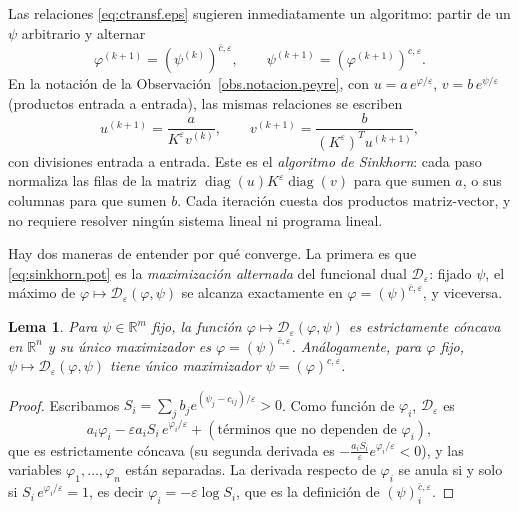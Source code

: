 \documentclass[12pt, a4paper]{amsbook}
\newcommand{\R}{{\mathbb R}}
\newtheorem{lema}[teo]{Lema}
\theoremstyle{remark}
\theoremstyle{definition}
\numberwithin{section}{chapter}
\numberwithin{subsection}{section}
\numberwithin{equation}{section}
\numberwithin{figure}{chapter}
\begin{document}
Las relaciones \eqref{eq:ctransf.eps} sugieren inmediatamente un algoritmo:
partir de un $\psi$ arbitrario y alternar
\begin{equation}\label{eq:sinkhorn.pot}
\varphi^{(k+1)}=(\psi^{(k)})^{\bar c,\varepsilon},
\qquad
\psi^{(k+1)}=(\varphi^{(k+1)})^{c,\varepsilon}.
\end{equation}
En la notación de la Observación~\ref{obs.notacion.peyre}, con $u=a\,e^{\varphi/\varepsilon}$,
$v=b\,e^{\psi/\varepsilon}$ (productos entrada a entrada), las mismas
relaciones se escriben
\begin{equation}\label{eq:sinkhorn.uv}
u^{(k+1)}=\frac{a}{K^\varepsilon v^{(k)}},
\qquad
v^{(k+1)}=\frac{b}{(K^\varepsilon)^Tu^{(k+1)}},
\end{equation}
con divisiones entrada a entrada. Este es el \emph{algoritmo de Sinkhorn}:
cada paso normaliza las filas de la matriz $\operatorname{diag}(u)K^\varepsilon\operatorname{diag}(v)$
para que sumen $a$, o sus columnas para que sumen $b$. Cada iteración cuesta
dos productos matriz-vector, y no requiere resolver ningún sistema lineal ni
programa lineal.

Hay dos maneras de entender por qué converge. La primera es que
\eqref{eq:sinkhorn.pot} es la \emph{maximización alternada} del funcional dual
$\mathcal D_\varepsilon$: fijado $\psi$, el máximo de $\varphi\mapsto\mathcal D_\varepsilon(\varphi,\psi)$
se alcanza exactamente en $\varphi=(\psi)^{\bar c,\varepsilon}$, y viceversa.

\begin{lema}\label{lema.maximizacion.alternada}
Para $\psi\in\R^m$ fijo, la función $\varphi\mapsto\mathcal D_\varepsilon(\varphi,\psi)$
es estrictamente cóncava en $\R^n$ y su único maximizador es
$\varphi=(\psi)^{\bar c,\varepsilon}$. Análogamente, para $\varphi$ fijo,
$\psi\mapsto\mathcal D_\varepsilon(\varphi,\psi)$ tiene único maximizador
$\psi=(\varphi)^{c,\varepsilon}$.
\end{lema}

\begin{proof}
Escribamos $S_i=\sum_jb_je^{(\psi_j-c_{ij})/\varepsilon}>0$. Como función de
$\varphi_i$, $\mathcal D_\varepsilon$ es
\[
a_i\varphi_i-\varepsilon a_iS_i\,e^{\varphi_i/\varepsilon}+(\text{términos que no dependen de }\varphi_i),
\]
que es estrictamente cóncava (su segunda derivada es
$-\tfrac{a_iS_i}{\varepsilon}e^{\varphi_i/\varepsilon}<0$), y las variables
$\varphi_1,\dots,\varphi_n$ están separadas. La derivada respecto de
$\varphi_i$ se anula si y solo si $S_i\,e^{\varphi_i/\varepsilon}=1$, es
decir $\varphi_i=-\varepsilon\log S_i$, que es la definición de
$(\psi)^{\bar c,\varepsilon}_i$.
\end{proof}
\end{document}
